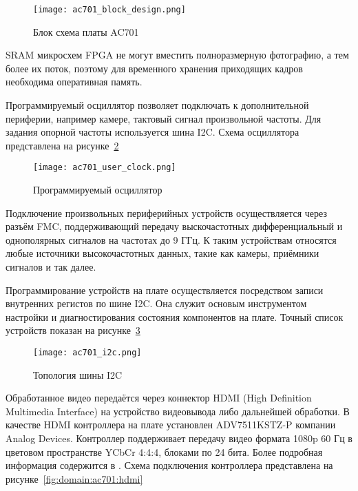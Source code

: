 \begin{figure}[ht]
  \centering
  \texttt{[image: ac701\_block\_design.png]}
  \caption{ Блок схема платы AC701 }
  \label{fig:domain:ac701:block_design}
\end{figure}

SRAM микросхем FPGA не могут вместить полноразмерную фотографию, а тем более их поток, поэтому
для временного хранения приходящих кадров необходима оперативная память. %

Программируемый осциллятор позволяет подключать к дополнительной периферии, например камере, тактовый сигнал произвольной частоты.
Для задания опорной частоты используется шина I2C. Схема осциллятора представлена на рисунке~\ref{fig:domain:ac701:user_clock}
\begin{figure}[ht]
  \centering
  \texttt{[image: ac701\_user\_clock.png]}
  \caption{ Программируемый осциллятор }
  \label{fig:domain:ac701:user_clock}
\end{figure}

Подключение произвольных периферийных устройств осуществляется через разъём FMC, поддерживающий передачу
выскочастотных дифференциальный и однополярных сигналов на частотах до 9 ГГц\cite[c. 57]{ac701_user_guide}.
К таким устройствам относятся любые источники высокочастотных данных, такие как камеры, приёмники сигналов и так далее.

Программирование устройств на плате осуществляется посредством записи внутренних регистов по шине I2C. Она служит основым
инструментом настройки и диагностирования состояния компонентов на плате. Точный список устройств показан на
рисунке~\ref{fig:domain:ac701:i2c}

\begin{figure}[ht]
  \centering
  \texttt{[image: ac701\_i2c.png]}
  \caption{ Топология шины I2C }
  \label{fig:domain:ac701:i2c}
\end{figure}

Обработанное видео передаётся через коннектор HDMI (High Definition Multimedia Interface) на устройство видеовывода либо дальнейшей обработки. В качестве
HDMI контроллера на плате установлен ADV7511KSTZ-P компании Analog Devices. Контроллер поддерживает передачу видео формата 1080p 60 Гц в
цветовом пространстве YCbCr 4:4:4, блоками по 24 бита. Более подробная информация содержится в \cite{adv7511_datasheet}.
Схема подключения контроллера представлена на рисунке~\ref{fig:domain:ac701:hdmi}


